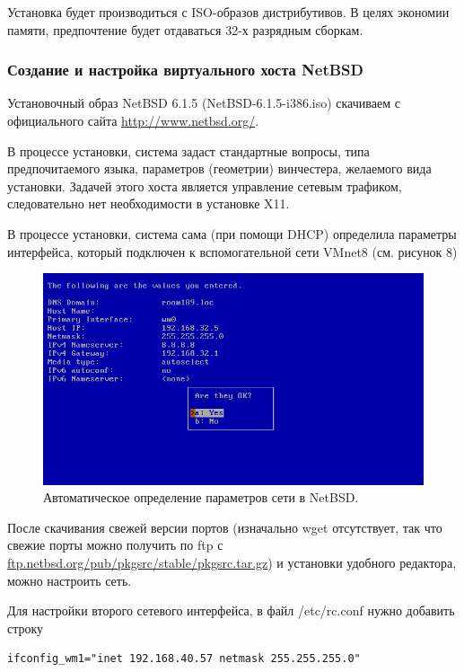 Установка будет производиться с ISO-образов дистрибутивов. В целях экономии памяти, предпочтение будет отдаваться 32-х разрядным сборкам.

\subsubsection{Создание и настройка виртуального хоста NetBSD}

Установочный образ NetBSD 6.1.5 (NetBSD-6.1.5-i386.iso) скачиваем с официального сайта \url{http://www.netbsd.org/}.

В процессе установки, система задаст стандартные вопросы, типа предпочитаемого языка, параметров (геометрии) винчестера, желаемого вида установки. Задачей этого хоста является управление сетевым трафиком, следовательно нет необходимости в установке X11.

В процессе установки, система сама (при помощи DHCP) определила параметры интерфейса, который подключен к вспомогательной сети VMnet8 (см. рисунок 8)

\begin{figure}[h!]
\centering
\includegraphics[scale=0.9]{res/netbsd-setup}
\caption{Автоматическое определение параметров сети в NetBSD.}
\end{figure}

После скачивания свежей версии портов (изначально wget отсутствует, так что свежие порты можно получить по ftp с \url{ftp.netbsd.org/pub/pkgsrc/stable/pkgsrc.tar.gz}) и установки удобного редактора, можно настроить сеть.

Для настройки второго сетевого интерфейса, в файл /etc/rc.conf нужно добавить строку
\begin{Verbatim}[frame=single]
ifconfig_wm1="inet 192.168.40.57 netmask 255.255.255.0"
\end{Verbatim}

